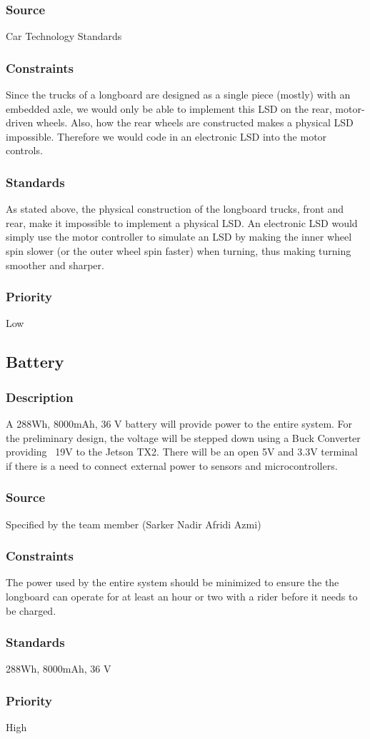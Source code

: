 \subsubsection{Source}
Car Technology Standards
\subsubsection{Constraints}
Since the trucks of a longboard are designed as a single piece (mostly) with an embedded axle, we would only be able to implement this LSD on the rear, motor-driven wheels. Also, how the rear wheels are constructed makes a physical LSD impossible. Therefore we would code in an electronic LSD into the motor controls.
\subsubsection{Standards}
As stated above, the physical construction of the longboard trucks, front and rear, make it impossible to implement a physical LSD. An electronic LSD would simply use the motor controller to simulate an LSD by making the inner wheel spin slower (or the outer wheel spin faster) when turning, thus making turning smoother and sharper.
\subsubsection{Priority}
Low

\subsection{Battery}
\subsubsection{Description}
A 288Wh, 8000mAh, 36 V battery will provide power to the entire system. For the preliminary design, the voltage will be stepped down using a Buck Converter providing ~19V to the Jetson TX2. There will be an open 5V and 3.3V terminal if there is a need to connect external power to sensors and microcontrollers.
\subsubsection{Source}
Specified by the team member (Sarker Nadir Afridi Azmi)
\subsubsection{Constraints}
The power used by the entire system should be minimized to ensure the the longboard can operate for at least an hour or two with a rider before it needs to be charged.
\subsubsection{Standards}
288Wh, 8000mAh, 36 V
\subsubsection{Priority}
High